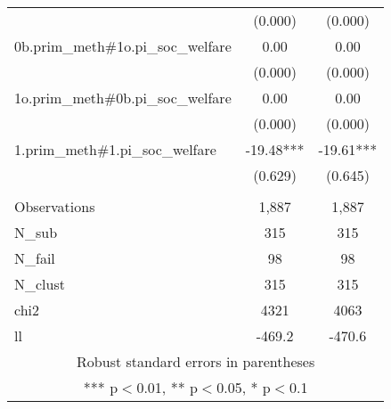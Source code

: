 \documentclass[]{article}
\begin{document}
\begin{tabular}{lcc}
 & (0.000) & (0.000) \\
0b.prim\_meth\#1o.pi\_soc\_welfare & 0.00 & 0.00 \\
 & (0.000) & (0.000) \\
1o.prim\_meth\#0b.pi\_soc\_welfare & 0.00 & 0.00 \\
 & (0.000) & (0.000) \\
1.prim\_meth\#1.pi\_soc\_welfare & -19.48*** & -19.61*** \\
 & (0.629) & (0.645) \\
 &  &  \\
Observations & 1,887 & 1,887 \\
N\_sub & 315 & 315 \\
N\_fail & 98 & 98 \\
N\_clust & 315 & 315 \\
chi2 & 4321 & 4063 \\
 ll & -469.2 & -470.6 \\ \hline
\multicolumn{3}{c}{ Robust standard errors in parentheses} \\
\multicolumn{3}{c}{ *** p$<$0.01, ** p$<$0.05, * p$<$0.1} \\
\end{tabular}
\end{document}
